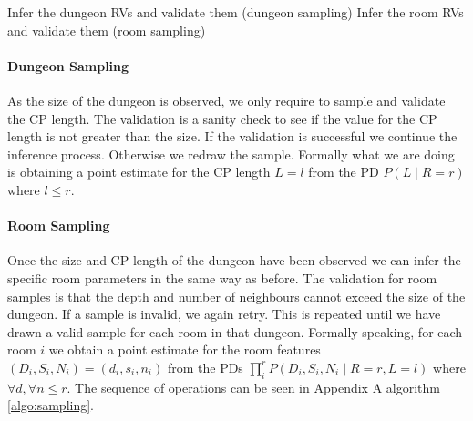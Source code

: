 \documentclass{UoYCSproject}
\begin{document}
\begin{outline}[enumerate]
  \1 Infer the dungeon RVs and validate them (dungeon sampling)
  \1 Infer the room RVs and validate them (room sampling)
\end{outline}


\paragraph{Dungeon Sampling}
 As the size of the dungeon is observed, we only require to sample and validate the CP length. The validation is a sanity check to see if the value for the CP length is not greater than the size. If the validation is successful we continue the inference process. Otherwise we redraw the sample. Formally what we are doing is obtaining a point estimate for the CP length \(L=l\) from the PD \(P(L\mid R = r)\) where \(l \le r\).

\paragraph{Room Sampling}
Once the size and CP length of the dungeon have been observed we can infer the specific room parameters in the same way as before. The validation for room samples is that the depth and number of neighbours cannot exceed the size of the dungeon. If a sample is invalid, we again retry. This is repeated until we have drawn a valid sample for each room in that dungeon. Formally speaking, for each room \(i\) we obtain a point estimate for the room features \((D_i, S_i, N_i) = (d_i, s_i, n_i)\) from the PDs \(\prod_{i}^{r} P(D_i, S_i, N_i \mid R =r, L = l)\) where \(\forall d, \forall n \le r\). The sequence of operations can be seen in Appendix A algorithm \ref{algo:sampling}.
\end{document}
